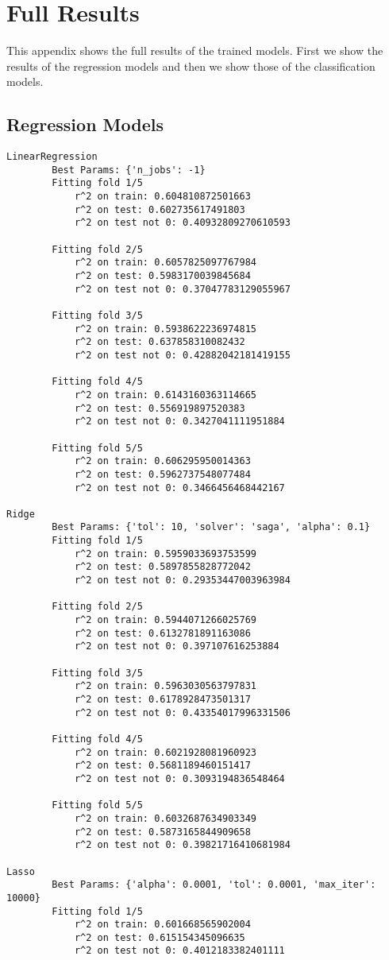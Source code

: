 \chapter{Full Results}\label{app:full_results}

This appendix shows the full results of the trained models. First we show the results of the regression models and then we show those of the classification models.

\section{Regression Models}
\begin{verbatim}
LinearRegression
		Best Params: {'n_jobs': -1}
		Fitting fold 1/5
			r^2 on train: 0.604810872501663
			r^2 on test: 0.602735617491803
			r^2 on test not 0: 0.40932809270610593

		Fitting fold 2/5
			r^2 on train: 0.6057825097767984
			r^2 on test: 0.5983170039845684
			r^2 on test not 0: 0.37047783129055967

		Fitting fold 3/5
			r^2 on train: 0.5938622236974815
			r^2 on test: 0.637858310082432
			r^2 on test not 0: 0.42882042181419155

		Fitting fold 4/5
			r^2 on train: 0.6143160363114665
			r^2 on test: 0.556919897520383
			r^2 on test not 0: 0.3427041111951884

		Fitting fold 5/5
			r^2 on train: 0.606295950014363
			r^2 on test: 0.5962737548077484
			r^2 on test not 0: 0.3466456468442167

Ridge
		Best Params: {'tol': 10, 'solver': 'saga', 'alpha': 0.1}
		Fitting fold 1/5
			r^2 on train: 0.5959033693753599
			r^2 on test: 0.5897855828772042
			r^2 on test not 0: 0.29353447003963984

		Fitting fold 2/5
			r^2 on train: 0.5944071266025769
			r^2 on test: 0.6132781891163086
			r^2 on test not 0: 0.397107616253884

		Fitting fold 3/5
			r^2 on train: 0.5963030563797831
			r^2 on test: 0.6178928473501317
			r^2 on test not 0: 0.43354017996331506

		Fitting fold 4/5
			r^2 on train: 0.6021928081960923
			r^2 on test: 0.5681189460151417
			r^2 on test not 0: 0.3093194836548464

		Fitting fold 5/5
			r^2 on train: 0.6032687634903349
			r^2 on test: 0.5873165844909658
			r^2 on test not 0: 0.39821716410681984

Lasso
		Best Params: {'alpha': 0.0001, 'tol': 0.0001, 'max_iter': 10000}
		Fitting fold 1/5
			r^2 on train: 0.601668565902004
			r^2 on test: 0.615154345096635
			r^2 on test not 0: 0.4012183382401111


\end{verbatim}
